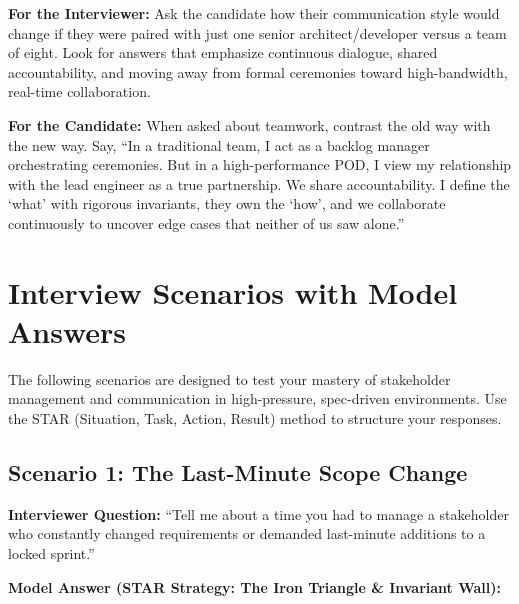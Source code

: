 \documentclass[
  11pt,
  openany,
  oneside]{book}
\renewenvironment{quote}{\begin{customquote}}{\end{customquote}}
\begin{document}
\begin{quote}
\textbf{For the Interviewer:} Ask the candidate how their communication
style would change if they were paired with just one senior
architect/developer versus a team of eight. Look for answers that
emphasize continuous dialogue, shared accountability, and moving away
from formal ceremonies toward high-bandwidth, real-time collaboration.
\end{quote}

\begin{quote}
\textbf{For the Candidate:} When asked about teamwork, contrast the old
way with the new way. Say, ``In a traditional team, I act as a backlog
manager orchestrating ceremonies. But in a high-performance POD, I view
my relationship with the lead engineer as a true partnership. We share
accountability. I define the `what' with rigorous invariants, they own
the `how', and we collaborate continuously to uncover edge cases that
neither of us saw alone.''
\end{quote}

\bigskip

\section{Interview Scenarios with Model
Answers}\label{interview-scenarios-with-model-answers}

The following scenarios are designed to test your mastery of stakeholder
management and communication in high-pressure, spec-driven environments.
Use the STAR (Situation, Task, Action, Result) method to structure your
responses.

\subsection{Scenario 1: The Last-Minute Scope
Change}\label{scenario-1-the-last-minute-scope-change}

\textbf{Interviewer Question:} ``Tell me about a time you had to manage
a stakeholder who constantly changed requirements or demanded
last-minute additions to a locked sprint.''

\textbf{Model Answer (STAR Strategy: The Iron Triangle \& Invariant
Wall):}
\end{document}
